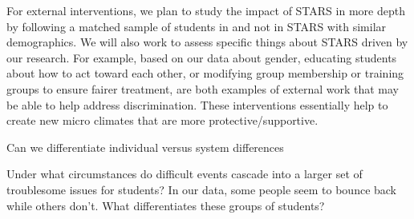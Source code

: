 For external interventions, we plan to study the impact of STARS in more depth by following a matched sample of students in and not in STARS with similar demographics. We will also work to assess specific things about STARS driven by our research. For example, based on our data about gender, educating students about how to act toward each other, or modifying group membership or training groups to ensure fairer treatment, are both examples of external work that may be able to help address discrimination. These interventions essentially help to create new micro climates that are more protective/supportive. 



Can we differentiate individual versus system differences

Under what circumstances do difficult events cascade into a larger set of troublesome issues for students? In our data, some people seem to bounce back while others don’t. What differentiates these groups of students?



